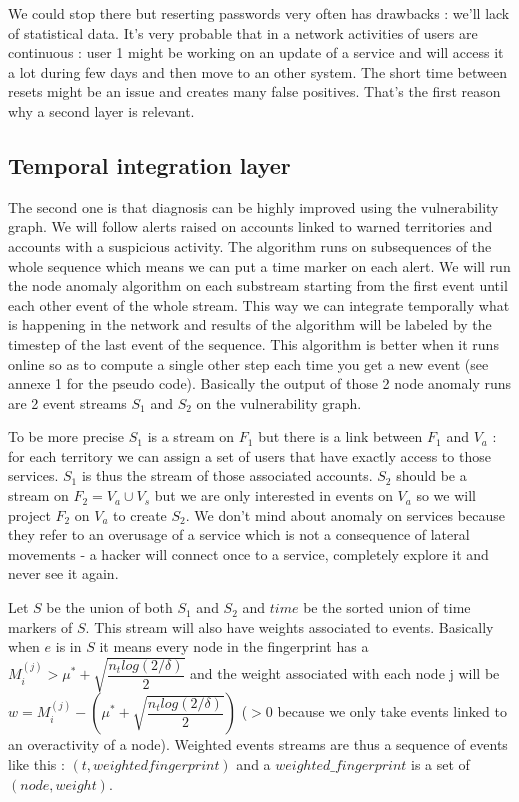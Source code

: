 \documentclass[11pt]{article}
\begin{document}
We could stop there but reserting passwords very often has drawbacks : we'll lack of statistical data. It's very probable that in a network activities of users are continuous : user 1 might be working on an update of a service and will access it a lot during few days and then move to an other system. The short time between resets might be an issue and creates many false positives. That's the first reason why a second layer is relevant.

\subsection{Temporal integration layer}

The second one is that diagnosis can be highly improved using the vulnerability graph. We will follow alerts raised on accounts linked to warned territories and accounts with a suspicious activity. The algorithm runs on subsequences of the whole sequence which means we can put a time marker on each alert. We will run the node anomaly algorithm on each substream starting from the first event until each other event of the whole stream. This way we can integrate temporally what is happening in the network and results of the algorithm will be labeled by the timestep of the last event of the sequence. This algorithm is better when it runs online so as to compute a single other step each time you get a new event (see annexe 1 for the pseudo code). Basically the output of those 2 node anomaly runs are 2 event streams $S_1$ and $S_2$ on the vulnerability graph.

To be more precise $S_1$ is a stream on $F_1$ but there is a link between $F_1$ and $V_a$ : for each territory we can assign a set of users that have exactly access to those services. $S_1$ is thus the stream of those associated accounts. $S_2$ should be a stream on $F_2=V_a\cup V_s$ but we are only interested in events on $V_a$ so we will project $F_2$ on $V_a$ to create $S_2$. We don't mind about anomaly on services because they refer to an overusage of a service which is not a consequence of lateral movements - a hacker will connect once to a service, completely explore it and never see it again. 

Let $S$ be the union of both $S_1$ and $S_2$ and $time$ be the sorted union of time markers of $S$. This stream will also have weights associated to events. Basically when $e$ is in $S$ it means every node in the fingerprint has a $M_i^{(j)} > \mu^*+\sqrt{\dfrac{n_tlog(2/\delta)}{2}}$ and the weight associated with each node j will be $w = M_i^{(j)} - (\mu^*+\sqrt{\dfrac{n_tlog(2/\delta)}{2}})$ ($>0$ because we only take events linked to an overactivity of a node). Weighted events streams are thus a sequence of events like this : $(t,weighted fingerprint)$ and a $weighted\_fingerprint$ is a set of $(node,weight)$.
\end{document}
